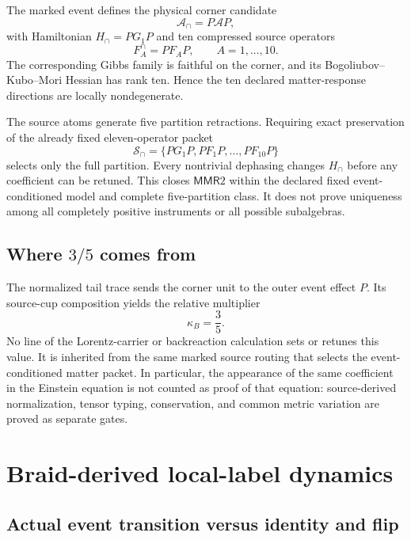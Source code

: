 \documentclass[11pt]{article}
\theoremstyle{definition}
\theoremstyle{remark}
\newcommand{\cA}{\mathcal{A}}
\newcommand{\cS}{\mathcal{S}}
\newcommand{\MMR}{\mathsf{MMR}}
\begin{document}
The marked event defines the physical corner candidate
\begin{equation}
 \cA_{\cap}=P\cA P,
\end{equation}
with Hamiltonian $H_{\cap}=PG_1P$ and ten compressed source operators
\begin{equation}
 F_A^{\cap}=PF_AP,\qquad A=1,\ldots,10.
\end{equation}
The corresponding Gibbs family is faithful on the corner, and its Bogoliubov--Kubo--Mori Hessian has rank ten. Hence the ten declared matter-response directions are locally nondegenerate.

The source atoms generate five partition retractions. Requiring exact preservation of the already fixed eleven-operator packet
\begin{equation}
 \cS_{\cap}=\{PG_1P,PF_1P,\ldots,PF_{10}P\}
\end{equation}
selects only the full partition. Every nontrivial dephasing changes $H_{\cap}$ before any coefficient can be retuned. This closes $\MMR2$ within the declared fixed event-conditioned model and complete five-partition class. It does not prove uniqueness among all completely positive instruments or all possible subalgebras.

\subsection{Where $3/5$ comes from}

The normalized tail trace sends the corner unit to the outer event effect $P$. Its source-cup composition yields the relative multiplier
\begin{equation}
 \kappa_B=\frac35.
\end{equation}
No line of the Lorentz-carrier or backreaction calculation sets or retunes this value. It is inherited from the same marked source routing that selects the event-conditioned matter packet. In particular, the appearance of the same coefficient in the Einstein equation is not counted as proof of that equation: source-derived normalization, tensor typing, conservation, and common metric variation are proved as separate gates.

\section{Braid-derived local-label dynamics}

\subsection{Actual event transition versus identity and flip}
\end{document}
